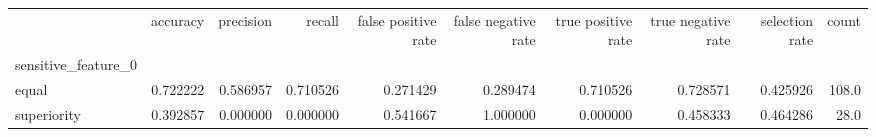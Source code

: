 \begin{tabular}{lrrrrrrrrr}
\toprule
{} &  accuracy &  precision &    recall &  false positive rate &  false negative rate &  true positive rate &  true negative rate &  selection rate &  count \\
sensitive\_feature\_0 &           &            &           &                      &                      &                     &                     &                 &        \\
\midrule
equal               &  0.722222 &   0.586957 &  0.710526 &             0.271429 &             0.289474 &            0.710526 &            0.728571 &        0.425926 &  108.0 \\
superiority         &  0.392857 &   0.000000 &  0.000000 &             0.541667 &             1.000000 &            0.000000 &            0.458333 &        0.464286 &   28.0 \\
\bottomrule
\end{tabular}
